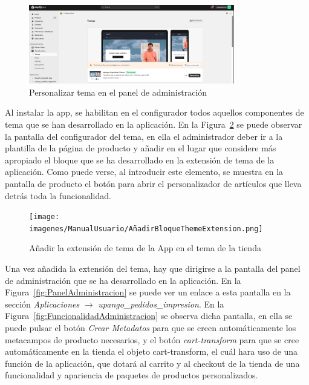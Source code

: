 \documentclass[11pt]{article}
\begin{document}
\begin{figure}[H]
    \centering
    \includegraphics[width=0.8\textwidth]{imagenes/ManualUsuario/PantallaDePersonalizarTema.png}
    \caption{\label{fig:PersonalizarTema}Personalizar tema en el panel de administración}
    \vspace{\fill}
\end{figure}

Al instalar la app, se habilitan en el configurador todos aquellos componentes de tema que se han desarrollado en la aplicación.
En la Figura~\ref{fig:ThemeAppExtension} se puede observar la pantalla del configurador del tema, en ella el administrador deber ir a la plantilla de la página de producto y añadir
en el lugar que considere más apropiado el bloque que se ha desarrollado en la extensión de tema de la aplicación. Como puede verse, al introducir este elemento, se muestra en la pantalla de producto
el botón para abrir el personalizador de artículos que lleva detrás toda la funcionalidad.

\begin{figure}[H]
    \centering
    \texttt{[image: imagenes/ManualUsuario/AñadirBloqueThemeExtension.png]}
    \caption{\label{fig:ThemeAppExtension}Añadir la extensión de tema de la App en el tema de la tienda}
    \vspace{\fill}
\end{figure}

Una vez añadida la extensión del tema, hay que dirigirse a la pantalla del panel de administración que se ha desarrollado en la aplicación. En la Figura~\ref{fig:PanelAdministracion} se puede
ver un enlace a esta pantalla en la sección \textit{Aplicaciones} $\rightarrow$  \textit{upango\_pedidos\_impresion}. En la Figura~\ref{fig:FuncionalidadAdministracion} se observa dicha pantalla, en ella se puede pulsar el botón \textit{Crear Metadatos} para que se creen 
automáticamente los metacampos de producto necesarios, y el botón \textit{cart-transform} para que se cree automáticamente en la tienda el objeto cart-transform, el cuál hara uso de una función de la aplicación, que 
dotará al carrito y al checkout de la tienda de una funcionalidad y apariencia de paquetes de productos personalizados.
\end{document}
